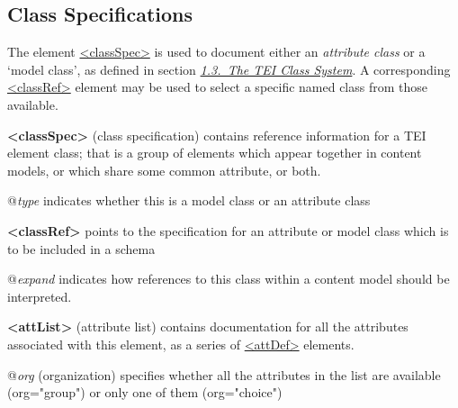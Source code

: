 \subsection[{Class Specifications}]{Class Specifications}\label{TDCLA}\par
The element \hyperref[TEI.classSpec]{<classSpec>} is used to document either an \textit{attribute class} or a ‘model class’, as defined in section \textit{\hyperref[STEC]{1.3.\ The TEI Class System}}. A corresponding \hyperref[TEI.classRef]{<classRef>} element may be used to select a specific named class from those available. 
\begin{sansreflist}
  
\item [\textbf{<classSpec>}] (class specification) contains reference information for a TEI element class; that is a group of elements which appear together in content models, or which share some common attribute, or both.\hfil\\[-10pt]\begin{sansreflist}
    \item[@{\itshape type}]
  indicates whether this is a model class or an attribute class
\end{sansreflist}  
\item [\textbf{<classRef>}] points to the specification for an attribute or model class which is to be included in a schema\hfil\\[-10pt]\begin{sansreflist}
    \item[@{\itshape expand}]
  indicates how references to this class within a content model should be interpreted.
\end{sansreflist}  
\item [\textbf{<attList>}] (attribute list) contains documentation for all the attributes associated with this element, as a series of \hyperref[TEI.attDef]{<attDef>} elements.\hfil\\[-10pt]\begin{sansreflist}
    \item[@{\itshape org}]
  (organization) specifies whether all the attributes in the list are available (org="group") or only one of them (org="choice")
\end{sansreflist}  
\end{sansreflist}
\par
